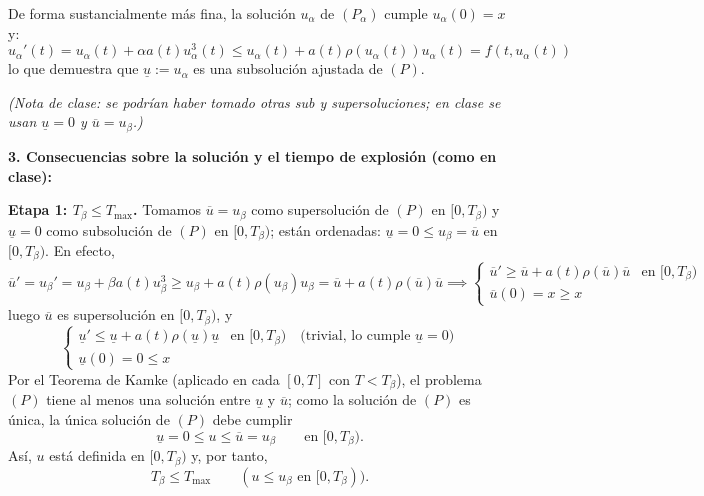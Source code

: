 {\begin{itemize}
        De forma sustancialmente más fina, la solución $u_\alpha$ de $(P_\alpha)$ cumple $u_\alpha(0) = x$ y:
        \[
            u_\alpha'(t) = u_\alpha(t) + \alpha a(t) u_\alpha^3(t) \leq u_\alpha(t) + a(t)\rho(u_\alpha(t)) u_\alpha(t) = f(t, u_\alpha(t))
        \]
        lo que demuestra que $\underline{u} := u_\alpha$ es una subsolución ajustada de $(P)$.
    \end{itemize}
    \textit{(Nota de clase: se podrían haber tomado otras sub y supersoluciones; en clase se usan $\underline{u} = 0$ y $\overline{u} = u_\beta$.)}

    \textbf{3. Consecuencias sobre la solución y el tiempo de explosión (como en clase):}

    \textbf{Etapa 1: $T_\beta \leq T_{\max}$.} Tomamos $\overline{u} = u_\beta$ como supersolución de $(P)$ en $[0, T_\beta)$ y $\underline{u} = 0$ como subsolución de $(P)$ en $[0, T_\beta)$; están ordenadas: $\underline{u} = 0 \leq u_\beta = \overline{u}$ en $[0, T_\beta)$. En efecto,
    \[
        \overline{u}' = u_\beta' = u_\beta + \beta a(t) u_\beta^3 \geq u_\beta + a(t) \rho(u_\beta) u_\beta = \overline{u} + a(t) \rho(\overline{u}) \overline{u}
        \implies
        \begin{cases}
            \overline{u}' \geq \overline{u} + a(t) \rho(\overline{u}) \overline{u} & \text{en } [0, T_\beta) \\
            \overline{u}(0) = x \geq x
        \end{cases}
    \]
    luego $\overline{u}$ es supersolución en $[0, T_\beta)$, y
    \[
        \begin{cases}
            \underline{u}' \leq \underline{u} + a(t) \rho(\underline{u}) \underline{u} & \text{en } [0, T_\beta) \quad \text{(trivial, lo cumple } \underline{u} = 0) \\
            \underline{u}(0) = 0 \leq x
        \end{cases}
    \]
    Por el Teorema de Kamke (aplicado en cada $[0, T]$ con $T < T_\beta$), el problema $(P)$ tiene al menos una solución entre $\underline{u}$ y $\overline{u}$; como la solución de $(P)$ es única, la única solución de $(P)$ debe cumplir
    \[
        \underline{u} = 0 \leq u \leq \overline{u} = u_\beta \qquad \text{en } [0, T_\beta).
    \]
    Así, $u$ está definida en $[0, T_\beta)$ y, por tanto,
    \[
        \boxed{T_\beta \leq T_{\max}} \qquad (u \leq u_\beta \text{ en } [0, T_\beta)).
    \]

}

